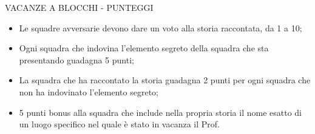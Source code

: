 \documentclass[aspectratio=1610]{beamer}
\begin{document}
\begin{frame}{VACANZE A BLOCCHI - PUNTEGGI}
    \begin{itemize}
        \item Le squadre avversarie devono dare un voto alla storia raccontata, da 1 a 10;
        \pause
        \item Ogni squadra che indovina l'elemento segreto della squadra che sta presentando guadagna 5 punti;
        \pause
        \item La squadra che ha raccontato la storia guadagna 2 punti per ogni squadra che non ha indovinato l'elemento segreto;
        \pause
        \item 5 punti bonus alla squadra che include nella propria storia il nome esatto di un luogo specifico nel quale è stato in vacanza il Prof.
    \end{itemize}
\end{frame}
\end{document}

